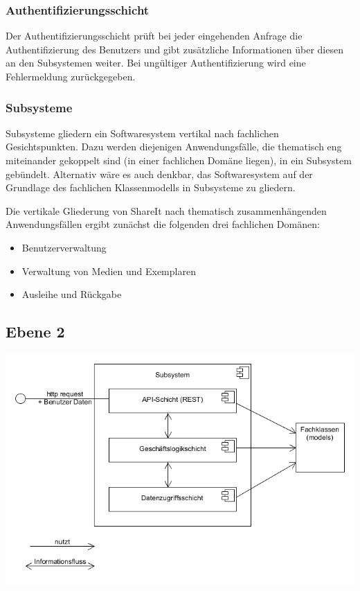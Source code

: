 \documentclass[]{report}
\begin{document}
\subsubsection{Authentifizierungsschicht}
Der Authentifizierungsschicht prüft bei jeder eingehenden Anfrage die Authentifizierung des Benutzers und gibt zusätzliche Informationen über diesen an den Subsystemen weiter.
Bei ungültiger Authentifizierung wird eine Fehlermeldung zurückgegeben.

\subsubsection{Subsysteme}
Subsysteme gliedern ein Softwaresystem vertikal nach fachlichen Gesichtspunkten. Dazu werden diejenigen Anwendungsfälle, die thematisch eng miteinander gekoppelt sind (in einer fachlichen Domäne liegen), in ein Subsystem gebündelt. Alternativ wäre es auch denkbar, das Softwaresystem auf der Grundlage des fachlichen Klassenmodells in Subsysteme zu gliedern.

 Die vertikale Gliederung von ShareIt nach thematisch zusammenhängenden Anwendungsfällen ergibt zunächst die folgenden drei fachlichen Domänen:
 \begin{itemize}
\item Benutzerverwaltung 
\item Verwaltung von Medien und Exemplaren 
\item Ausleihe und Rückgabe 
\end{itemize}
\subsection{Ebene 2}\label{_ebene_2}
\begin{center}
\includegraphics{images/Bausteinsicht E2.png}
\end{center}
\end{document}
